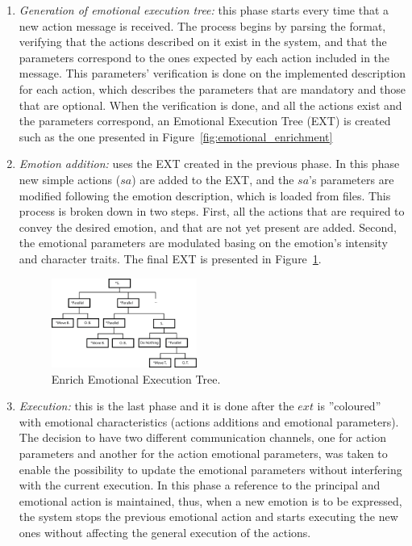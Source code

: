 \begin{enumerate}
	\item \textit{Generation of emotional execution tree:} this phase starts every time that a new action message is received. The process begins by parsing the format, verifying that the actions described on it exist in the system, and that the parameters correspond to the ones expected by each action included in the message. This parameters' verification is done on the implemented description for each action, which describes the parameters that are mandatory and those that are optional. %
When the verification is done, and all the actions exist and the parameters correspond, an Emotional Execution Tree (EXT)
is created such as the one presented in Figure~\ref{fig:emotional_enrichment}
	\item \textit{Emotion addition:} uses the EXT created in the previous phase. In this phase new simple actions ($sa$)
are added to the EXT, and the $sa$'s parameters are modified following the emotion description, which is loaded from files. This process is broken down in two steps. First, all the actions that are required to convey the desired emotion, and that are not yet present are added. Second, the emotional parameters are modulated basing on the emotion's intensity and character traits. The final EXT is presented in Figure~\ref{fig:reference}.
	\begin{figure}
		\centering
	\includegraphics[width=0.45\textwidth]{./Images/exampleTreeE.png}
	\caption{Enrich Emotional Execution Tree.} 
	\label{fig:reference}
	\end{figure}
	\item \textit{Execution:} this is the last phase and it is done after the $ext$ is ''coloured'' with emotional characteristics (actions additions and emotional parameters). The decision to have two different communication channels, one for action parameters and another for the action emotional parameters, was taken to enable the possibility to update the emotional parameters without interfering with the current execution. In this phase a reference to the principal and emotional action is maintained, thus, when a new emotion is to be expressed, the system stops the previous emotional action and starts executing the new ones without affecting the general execution of the actions.
\end{enumerate}

